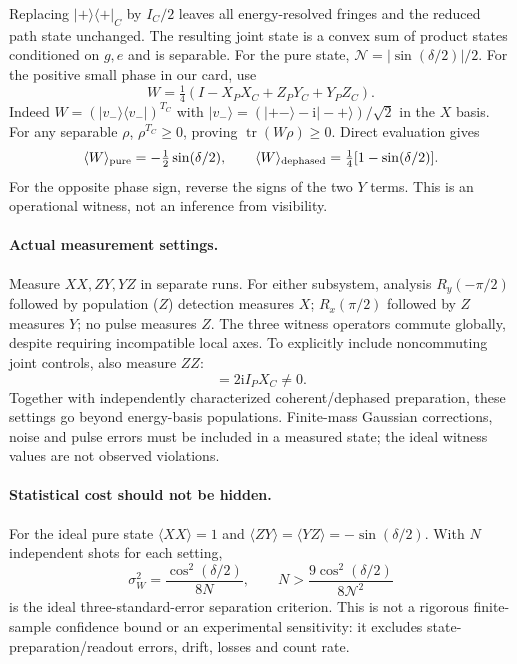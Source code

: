 \documentclass[11pt,a4paper]{article}
\newcommand{\ii}{\mathrm i}
\newcommand{\tr}{\operatorname{tr}}
\begin{document}
Replacing $|+\rangle\langle+|_C$ by $I_C/2$ leaves all energy-resolved
fringes and the reduced path state unchanged. The resulting joint state
is a convex sum of product states conditioned on $g,e$ and is separable.
For the pure state, $\mathcal N=|\sin(\delta/2)|/2$.
For the positive small phase in our card, use
\begin{equation}
 W=\tfrac14(I-X_PX_C+Z_PY_C+Y_PZ_C).\label{witness}
\end{equation}
Indeed $W=(|v_-\rangle\langle v_-|)^{T_C}$ with
$|v_-\rangle=(|+-\rangle-\ii|-+\rangle)/\sqrt2$ in the $X$ basis.
For any separable $\rho$, $\rho^{T_C}\geq0$, proving
$\tr(W\rho)\geq0$. Direct evaluation gives
\begin{equation}
 \langle W\rangle_{\rm pure}=-\tfrac12\sin(\delta/2),\qquad
 \langle W\rangle_{\rm dephased}=\tfrac14[1-\sin(\delta/2)] .
\end{equation}
For the opposite phase sign, reverse the signs of the two $Y$ terms.
This is an operational witness, not an inference from visibility.

\paragraph{Actual measurement settings.}
Measure $XX,ZY,YZ$ in separate runs. For either subsystem, analysis
$R_y(-\pi/2)$ followed by population ($Z$) detection measures $X$;
$R_x(\pi/2)$ followed by $Z$ measures $Y$; no pulse measures $Z$.
The three witness operators commute globally, despite requiring
incompatible local axes. To explicitly include noncommuting joint
controls, also measure $ZZ$:
\begin{equation}
 [Z_PY_C,Z_PZ_C]=2\ii I_PX_C\ne0 .
\end{equation}
Together with independently characterized coherent/dephased preparation,
these settings go beyond energy-basis populations. Finite-mass Gaussian
corrections, noise and pulse errors must be included in a measured state;
the ideal witness values are not observed violations.

\paragraph{Statistical cost should not be hidden.}
For the ideal pure state $\langle XX\rangle=1$ and
$\langle ZY\rangle=\langle YZ\rangle=-\sin(\delta/2)$.
With $N$ independent shots for each setting,
\begin{equation}
 \sigma_W^2=\frac{\cos^2(\delta/2)}{8N},\qquad
 N>\frac{9\cos^2(\delta/2)}{8\mathcal N^2}
\end{equation}
is the ideal three-standard-error separation criterion. This is not a
rigorous finite-sample confidence bound or an experimental sensitivity:
it excludes state-preparation/readout errors, drift, losses and count rate.
\end{document}
